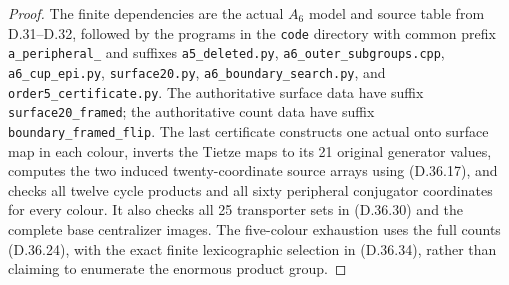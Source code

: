 \begin{proof}
The finite dependencies are the actual
\(A_6\) model and source table from D.31--D.32,
followed by the programs in the \texttt{code} directory
with common prefix \texttt{a\_peripheral\_} and suffixes
\texttt{a5\_deleted.py},
\texttt{a6\_outer\_subgroups.cpp},
\texttt{a6\_cup\_epi.py},
\texttt{surface20.py},
\texttt{a6\_boundary\_search.py}, and
\texttt{order5\_certificate.py}.
The authoritative surface data have suffix
\texttt{surface20\_framed}; the authoritative
count data have suffix
\texttt{boundary\_framed\_flip}.
The last certificate constructs one actual
onto surface map in each colour, inverts
the Tietze maps to its 21 original generator
values, computes the two induced
twenty-coordinate source arrays using
\textup{(D.36.17)}, and checks all twelve
cycle products and all sixty peripheral
conjugator coordinates for every colour.
It also checks all 25 transporter sets in
\textup{(D.36.30)} and the complete base
centralizer images.  The five-colour
exhaustion uses the full counts
\textup{(D.36.24)}, with the exact finite
lexicographic selection in
\textup{(D.36.34)}, rather than claiming
to enumerate the enormous product group.
\end{proof}
